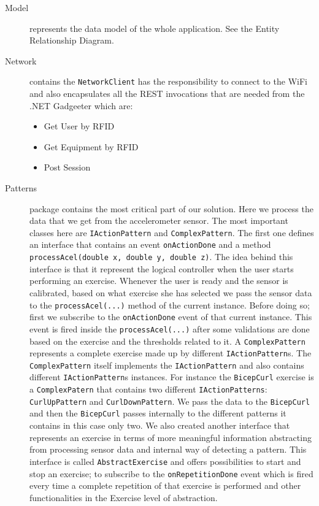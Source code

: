 \documentclass{tk3-team}
\begin{document}
\begin{description}
\item[Model] represents the data model of the whole application. See the Entity Relationship Diagram. 

\item[Network] contains the \texttt{NetworkClient} has the responsibility to connect to the WiFi and also encapsulates all the REST invocations that are needed from the .NET Gadgeeter which are: 
\begin{itemize}
	\item Get User by RFID
	\item Get Equipment by RFID 
	\item Post Session
\end{itemize}


\item[Patterns] package contains the most critical part of our solution. Here we process the data that we get from the accelerometer sensor. The most important classes here are \texttt{IActionPattern} and \texttt{ComplexPattern}. The first one defines an interface that contains an event \texttt{onActionDone} and a method \texttt{processAcel(double x, double y, double z)}. The idea behind this interface is that it represent the logical controller when the user starts performing an exercise. Whenever the user is ready and the sensor is calibrated, based on what exercise she has selected we pass the sensor data to the \texttt{processAcel(...)} method of the current instance. Before doing so; first we subscribe to the \texttt{onActionDone} event of that current instance. This event is fired inside the \texttt{processAcel(...)} after some validations are done based on the exercise and the thresholds related to it.
A \texttt{ComplexPattern} represents a complete exercise made up by different \texttt{IActionPattern}s. The \texttt{ComplexPattern} itself implements the \texttt{IActionPattern} and also contains different \texttt{IActionPattern}s instances. For instance the \texttt{BicepCurl} exercise is a \texttt{ComplexPatern} that contains two different \texttt{IActionPatterns}: \texttt{CurlUpPattern} and \texttt{CurlDownPattern}. We pass the data to the \texttt{BicepCurl} and then the \texttt{BicepCurl} passes internally to the different patterns it contains in this case only two. We also created another interface that represents an exercise in terms of more meaningful information abstracting from processing sensor data and internal way of detecting a pattern. This interface is called \texttt{AbstractExercise} and offers possibilities to start and stop an exercise; to subscribe to the \texttt{onRepetitionDone} event which is fired every time a complete repetition of that exercise is performed and other functionalities in the Exercise level of abstraction.

 


\end{description}
\end{document}
